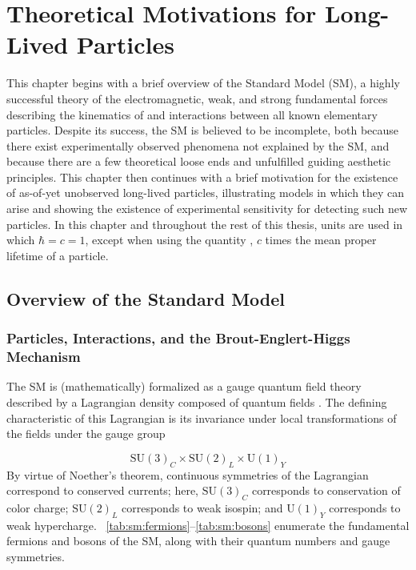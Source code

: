 \newcommand{\mtworow}[1]{\multirow{2}{*}{#1}}

\chapter{Theoretical Motivations for Long-Lived Particles}
\label{chap:theory}

This chapter begins with a brief overview of the Standard Model (SM), a highly successful theory of the electromagnetic, weak, and strong fundamental forces describing the kinematics of and interactions between all known elementary particles.
Despite its success, the SM is believed to be incomplete, both because there exist experimentally observed phenomena not explained by the SM, and because there are a few theoretical loose ends and unfulfilled guiding aesthetic principles. 
This chapter then continues with a brief motivation for the existence of as-of-yet unobserved long-lived particles, illustrating models in which they can arise and showing the existence of experimental sensitivity for detecting such new particles.
In this chapter and throughout the rest of this thesis, units are used in which $\hbar = c = 1$, except when using the quantity \cTau, \ie $c$ times the mean proper lifetime of a particle.

\section{Overview of the Standard Model}
\subsection{Particles, Interactions, and the Brout-Englert-Higgs Mechanism}
The SM is (mathematically) formalized as a gauge quantum field theory described by a Lagrangian density composed of quantum fields \cite{Griffiths, Srednicki, SMLag, PDG:Electroweak, PDG:Higgs}.
The defining characteristic of this Lagrangian is its invariance under local transformations of the fields under the gauge group

\begin{equation}
  \mathrm{SU}(3)_C\times\mathrm{SU}(2)_L\times\mathrm{U}(1)_Y
  \label{eq:sm:gaugegroup}
\end{equation}
By virtue of Noether's theorem, continuous symmetries of the Lagrangian correspond to conserved currents; here, $\mathrm{SU}(3)_C$ corresponds to conservation of color charge; $\mathrm{SU}(2)_L$ corresponds to weak isospin; and $\mathrm{U}(1)_Y$ corresponds to weak hypercharge.
\Tabs~\ref{tab:sm:fermions}--\ref{tab:sm:bosons} enumerate the fundamental fermions and bosons of the SM, along with their quantum numbers and gauge symmetries.

